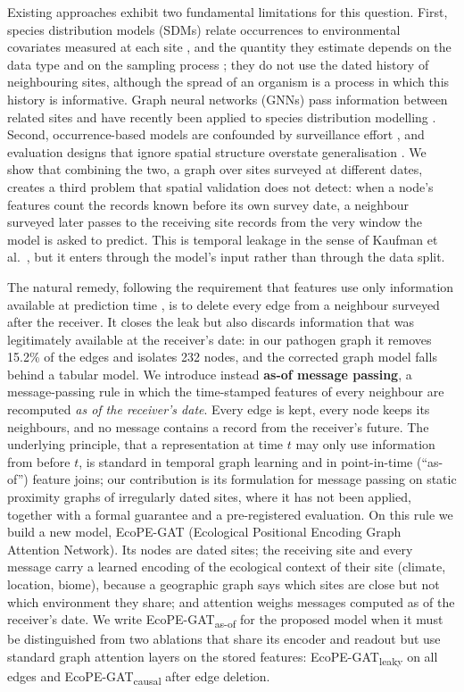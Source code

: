 \documentclass[a4paper,fleqn]{cas-sc}
\newcommand{\Masof}{\mbox{EcoPE-GAT\textsubscript{as-of}}}
\newcommand{\Mcausal}{\mbox{EcoPE-GAT\textsubscript{causal}}}
\newcommand{\Mleaky}{\mbox{EcoPE-GAT\textsubscript{leaky}}}
\begin{document}
Existing approaches exhibit two fundamental limitations for this question. First, species distribution models (SDMs) relate occurrences to environmental covariates measured at each site \citep{elith2009}, and the quantity they estimate depends on the data type and on the sampling process \citep{guillera2015}; they do not use the dated history of neighbouring sites, although the spread of an organism is a process in which this history is informative. Graph neural networks (GNNs) pass information between related sites and have recently been applied to species distribution modelling \citep{wu2025,harrell2025}. Second, occurrence-based models are confounded by surveillance effort \citep{beck2014,phillips2009}, and evaluation designs that ignore spatial structure overstate generalisation \citep{roberts2017,ploton2020}. We show that combining the two, a graph over sites surveyed at different dates, creates a third problem that spatial validation does not detect: when a node's features count the records known before its own survey date, a neighbour surveyed later passes to the receiving site records from the very window the model is asked to predict. This is temporal leakage in the sense of Kaufman et al.~\citep{kaufman2012}, but it enters through the model's input rather than through the data split.

The natural remedy, following the requirement that features use only information available at prediction time \citep{kaufman2012}, is to delete every edge from a neighbour surveyed after the receiver. It closes the leak but also discards information that was legitimately available at the receiver's date: in our pathogen graph it removes 15.2\% of the edges and isolates 232 nodes, and the corrected graph model falls behind a tabular model. We introduce instead \textbf{as-of message passing}, a message-passing rule in which the time-stamped features of every neighbour are recomputed \emph{as of the receiver's date}. Every edge is kept, every node keeps its neighbours, and no message contains a record from the receiver's future. The underlying principle, that a representation at time $t$ may only use information from before $t$, is standard in temporal graph learning \citep{xu2020tgat,rossi2020} and in point-in-time (``as-of'') feature joins; our contribution is its formulation for message passing on static proximity graphs of irregularly dated sites, where it has not been applied, together with a formal guarantee and a pre-registered evaluation. On this rule we build a new model, EcoPE-GAT (Ecological Positional Encoding Graph Attention Network). Its nodes are dated sites; the receiving site and every message carry a learned encoding of the ecological context of their site (climate, location, biome), because a geographic graph says which sites are close but not which environment they share; and attention weighs messages computed as of the receiver's date. We write \Masof{} for the proposed model when it must be distinguished from two ablations that share its encoder and readout but use standard graph attention layers on the stored features: \Mleaky{} on all edges and \Mcausal{} after edge deletion.
\end{document}
